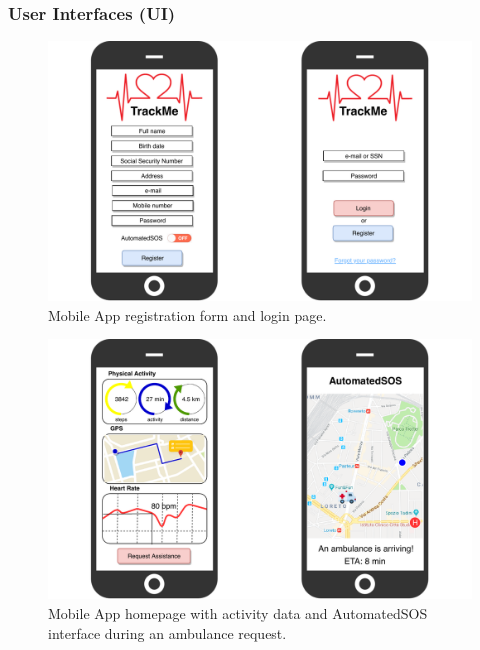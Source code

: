 \documentclass[12pt,a4paper]{article}
\begin{document}
				\subsubsection{User Interfaces (UI)}
					\begin{figure}[h]
						\centering
						\includegraphics[width=1.0\linewidth]{Images/login-registration.pdf}
						\caption{Mobile App registration form and login page.}
						\label{fig:login-registration}
					\end{figure}
					\begin{figure}[H]
						\centering
						\includegraphics[width=1.0\linewidth]{Images/pages}
						\caption{Mobile App homepage with activity data and AutomatedSOS interface during an ambulance request.}
					\end{figure}
\end{document}
